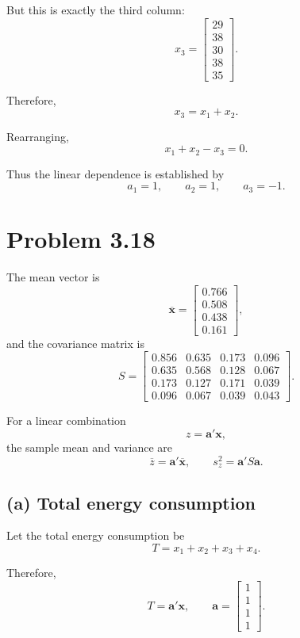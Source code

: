 \documentclass[12pt,a4paper]{article}
\begin{document}
But this is exactly the third column:
\[
x_3=
\begin{bmatrix}
29\\38\\30\\38\\35
\end{bmatrix}.
\]

Therefore,
\[
\boxed{x_3=x_1+x_2}.
\]

Rearranging,
\[
x_1+x_2-x_3=0.
\]

Thus the linear dependence is established by
\[
\boxed{a_1=1,\qquad a_2=1,\qquad a_3=-1}.
\]

\newpage
\section{Problem 3.18}

The mean vector is
\[
\overline{\mathbf{x}}
=
\begin{bmatrix}
0.766\\
0.508\\
0.438\\
0.161
\end{bmatrix},
\]
and the covariance matrix is
\[
S=
\begin{bmatrix}
0.856&0.635&0.173&0.096\\
0.635&0.568&0.128&0.067\\
0.173&0.127&0.171&0.039\\
0.096&0.067&0.039&0.043
\end{bmatrix}.
\]

For a linear combination
\[
z=\mathbf{a}'\mathbf{x},
\]
the sample mean and variance are
\[
\overline{z}=\mathbf{a}'\overline{\mathbf{x}},
\qquad
s_z^2=\mathbf{a}'S\mathbf{a}.
\]

\subsection*{(a) Total energy consumption}

Let the total energy consumption be
\[
T=x_1+x_2+x_3+x_4.
\]

Therefore,
\[
T=\mathbf{a}'\mathbf{x},
\qquad
\mathbf{a}
=
\begin{bmatrix}
1\\1\\1\\1
\end{bmatrix}.
\]
\end{document}
